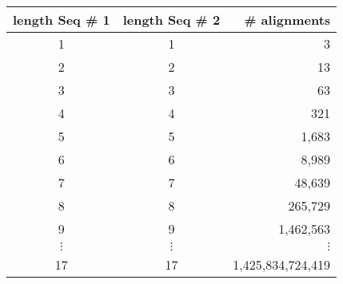 \documentclass[landscape]{foils}
\begin{document}
\myNewSlide
\begin{tabular}{c|c|r}
length Seq \# 1 &length Seq \# 2 & \# alignments\\
\hline
1 & 1 &    3 \\
2 & 2 &   13 \\
3 & 3 &   63 \\
4 & 4 &  321 \\
5 & 5 & 1,683 \\
6 & 6 & 8,989 \\
7 & 7 & 48,639 \\
8 & 8 & 265,729 \\
9 & 9 & 1,462,563 \\
$\vdots$ &$\vdots$ & $\vdots$\\
17 & 17 & 1,425,834,724,419
\end{tabular}

\myNewSlide
\end{document}

